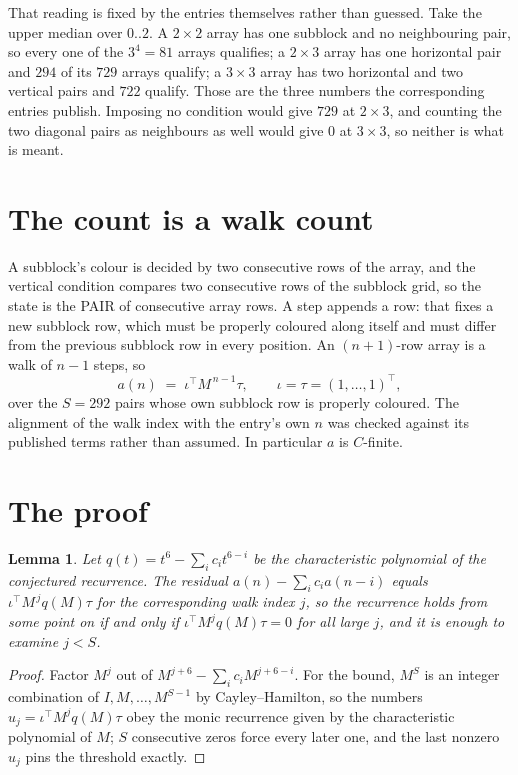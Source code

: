 \documentclass[11pt,a4paper]{article}
\theoremstyle{plain}
\newtheorem{lemma}[theorem]{Lemma}
\theoremstyle{definition}
\begin{document}
That reading is fixed by the entries themselves rather than guessed. Take the upper median
over $0..2$. A $2\times2$ array has one subblock and no neighbouring pair, so every one of the
$3^4=81$ arrays qualifies; a $2\times3$ array has one horizontal pair and $294$ of its $729$
arrays qualify; a $3\times3$ array has two horizontal and two vertical pairs and $722$
qualify. Those are the three numbers the corresponding entries publish. Imposing no condition
would give $729$ at $2\times3$, and counting the two diagonal pairs as neighbours as well
would give $0$ at $3\times3$, so neither is what is meant.

\section{The count is a walk count}

A subblock's colour is decided by two consecutive rows of the array, and
the vertical condition compares two consecutive rows of the subblock grid, so the state is the
PAIR of consecutive array rows. A step appends a row: that fixes a new subblock row, which
must be properly coloured along itself and must differ from the previous subblock row in every
position. An $(n+1)$-row array is a walk of $n-1$ steps, so
\[
a(n)\;=\;\iota^{\!\top}M^{\,n-1}\tau,\qquad\iota=\tau=(1,\dots,1)^{\!\top},
\]
over the $S=292$ pairs whose own subblock row is properly coloured.
The alignment of the walk index with the entry's own $n$ was checked against its published
terms rather than assumed. In particular $a$ is $C$-finite.

\section{The proof}

\begin{lemma}\label{lem:crit}
Let $q(t)=t^{6}-\sum_i c_it^{6-i}$ be the characteristic polynomial of the
conjectured recurrence. The residual $a(n)-\sum_ic_ia(n-i)$ equals
$\iota^{\!\top}M^{\,j}q(M)\tau$ for the corresponding walk index $j$, so the recurrence
holds from some point on if and only if $\iota^{\!\top}M^{j}q(M)\tau=0$ for all large $j$,
and it is enough to examine $j<S$.
\end{lemma}

\begin{proof}
Factor $M^{j}$ out of $M^{j+6}-\sum_ic_iM^{j+6-i}$. For the bound, $M^{S}$
is an integer combination of $I,M,\dots,M^{S-1}$ by Cayley--Hamilton, so the numbers
$u_j=\iota^{\!\top}M^{j}q(M)\tau$ obey the monic recurrence given by the characteristic
polynomial of $M$; $S$ consecutive zeros force every later one, and the last nonzero $u_j$
pins the threshold exactly.
\end{proof}
\end{document}
